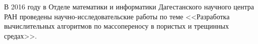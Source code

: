 \Conclusion

В 2016 году в Отделе математики и информатики Дагестанского научного центра РАН проведены научно-исследовательские работы по теме
<<Разработка вычислительных алгоритмов по массопереносу в пористых и трещинных средах>>.







